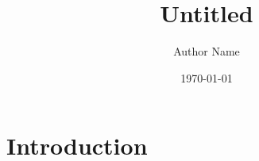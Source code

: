 \documentclass[11pt]{article}
\title{Untitled}
\author{Author Name}
\date{\today}
\begin{document}
\maketitle

\section{Introduction}
\end{document}
